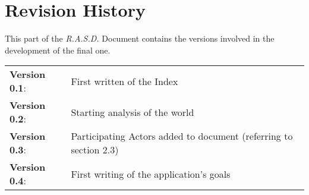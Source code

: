 \section{Revision History}

This part of the \emph{R.A.S.D.} Document contains the versions involved in the development of the final one.

\vspace{10pt}

\begin{tabular}{l l}

	\textbf{Version 0.1}: & First written of the Index \\
    
    \textbf{Version 0.2}: & Starting analysis of the world \\

	\textbf{Version 0.3}: & Participating Actors added to document (referring to section 2.3)\\
    
    \textbf{Version 0.4}: & First writing of the application's goals\\
    

\end{tabular}